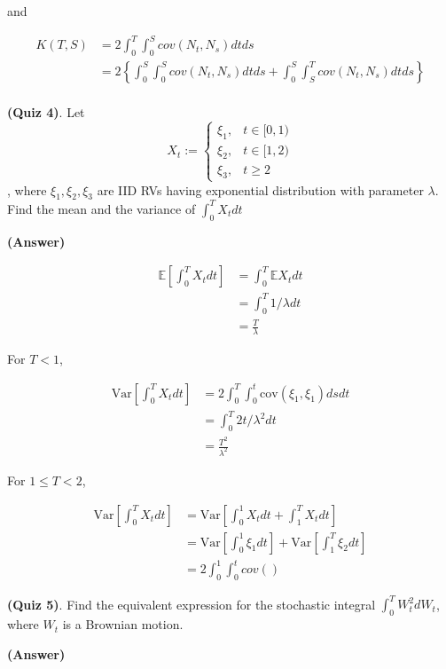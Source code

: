 \documentclass[12pt]{article}
\theoremstyle{nonumberbreak}
\begin{document}
and 

$$
\begin{aligned}
K(T,S) &= 2 \int_0^T \int_0^S cov(N_t, N_s)dtds \\[8pt]
&= 2 \left\{ \int_0^S \int_0^S cov(N_t, N_s) dt ds + \int_0^S \int_S^T cov(N_t, N_s) dt ds  \right\} \\[8pt]
\end{aligned}
$$



\textbf{(Quiz 4)}. Let 
$$
X_t := \begin{cases}
\xi_1, &t \in [0, 1) \\
\xi_2, &t \in [1, 2) \\
\xi_3, &t \ge 2
\end{cases}
$$, where $\xi_1, \xi_2, \xi_3$ are IID RVs having exponential distribution with parameter $\lambda$. Find the mean and the variance of $\int_0^T X_t dt$

\textbf{(Answer)} 

$$
\begin{aligned}
\mathbb{E} \left[\int_0^T X_t dt \right] &= \int_0^T \mathbb{E}X_t dt \\[8pt]
&= \int_0^T 1/\lambda dt \\[8pt]
&= \frac{T}{\lambda}
\end{aligned}
$$

For $T < 1$, 

$$
\begin{aligned}
\mathrm{Var} \left[\int_0^T X_t dt \right] &= 2 \int_0^T \int_0^t \mathrm{cov}(\xi_1, \xi_1)dsdt \\[8pt]
&= \int_0^T 2t/\lambda^2 dt \\[8pt]
&= \frac{T^2}{\lambda^2}
\end{aligned}
$$

For $1 \le T < 2$, 

$$
\begin{aligned}
\mathrm{Var} \left[\int_0^T X_t dt \right] &= \mathrm{Var} \left[\int_0^1 X_t dt + \int_1^T X_t dt \right] \\[8pt]
&= \mathrm{Var}[\int_0^1 \xi_1 dt] + \mathrm{Var}[\int_1^T \xi_2 dt] \\[8pt]
&= 2 \int_0^1\int_0^t cov()
\end{aligned}
$$



\textbf{(Quiz 5)}. Find the equivalent expression for the stochastic integral $\int_0^T W_t^2 dW_t$, where $W_t$ is a Brownian motion.


\textbf{(Answer)} 
\end{document}
